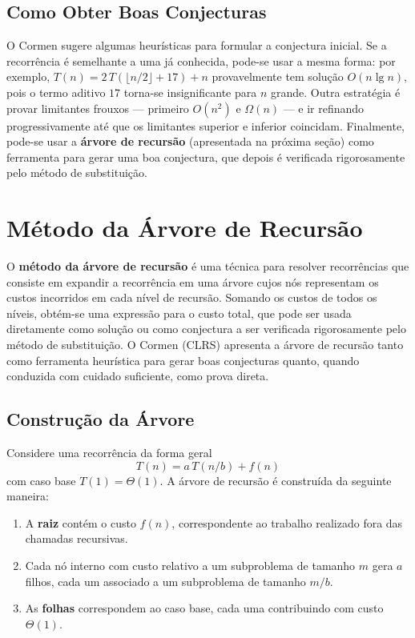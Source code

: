 \documentclass[9pt,a4paper]{extarticle}
\begin{document}
\subsection{Como Obter Boas Conjecturas}

O Cormen sugere algumas heurísticas para formular a conjectura inicial. Se a recorrência é semelhante a uma já conhecida, pode-se usar a mesma forma: por exemplo, $T(n) = 2\,T(\lfloor n/2 \rfloor + 17) + n$ provavelmente tem solução $O(n \lg n)$, pois o termo aditivo $17$ torna-se insignificante para $n$ grande. Outra estratégia é provar limitantes frouxos --- primeiro $O(n^2)$ e $\Omega(n)$ --- e ir refinando progressivamente até que os limitantes superior e inferior coincidam. Finalmente, pode-se usar a \textbf{árvore de recursão} (apresentada na próxima seção) como ferramenta para gerar uma boa conjectura, que depois é verificada rigorosamente pelo método de substituição.

\section{Método da Árvore de Recursão}

O \textbf{método da árvore de recursão} é uma técnica para resolver recorrências que consiste em expandir a recorrência em uma árvore cujos nós representam os custos incorridos em cada nível de recursão. Somando os custos de todos os níveis, obtém-se uma expressão para o custo total, que pode ser usada diretamente como solução ou como conjectura a ser verificada rigorosamente pelo método de substituição. O Cormen (CLRS) apresenta a árvore de recursão tanto como ferramenta heurística para gerar boas conjecturas quanto, quando conduzida com cuidado suficiente, como prova direta.

\subsection{Construção da Árvore}

Considere uma recorrência da forma geral
%
\[
T(n) = a\,T(n/b) + f(n)
\]
%
\noindent com caso base $T(1) = \Theta(1)$. A árvore de recursão é construída da seguinte maneira:

\begin{enumerate}
    \item A \textbf{raiz} contém o custo $f(n)$, correspondente ao trabalho realizado fora das chamadas recursivas.
    \item Cada nó interno com custo relativo a um subproblema de tamanho $m$ gera $a$ filhos, cada um associado a um subproblema de tamanho $m/b$.
    \item As \textbf{folhas} correspondem ao caso base, cada uma contribuindo com custo $\Theta(1)$.
\end{enumerate}
\end{document}
